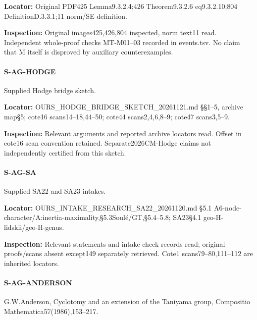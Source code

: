\documentclass[11pt,a4paper]{article}
\begin{document}
\textbf{Locator:} Original PDF425 Lemma9.\allowbreak{}3.\allowbreak{}2.\allowbreak{}4;426 Theorem9.\allowbreak{}3.\allowbreak{}2.\allowbreak{}6 eq9.\allowbreak{}3.\allowbreak{}2.\allowbreak{}10;804 DefinitionD.\allowbreak{}3.\allowbreak{}3.\allowbreak{}1;11 norm/\allowbreak{}SE definition.

\textbf{Inspection:} Original images425,426,804 inspected, norm text11 read.\allowbreak{} Independent whole-proof checks MT-M01–\allowbreak{}03 recorded in events.\allowbreak{}tsv.\allowbreak{} No claim that M itself is disproved by auxiliary counterexamples.\allowbreak{}


\paragraph{S-AG-HODGE} Supplied Hodge bridge sketch.

\textbf{Locator:} OURS\_\allowbreak{}HODGE\_\allowbreak{}BRIDGE\_\allowbreak{}SKETCH\_\allowbreak{}20261121.\allowbreak{}md §§1–\allowbreak{}5, archive map§5; cote16 scans14–\allowbreak{}18,44–\allowbreak{}50; cote44 scans2,4,6,8–\allowbreak{}9; cote47 scans3,5–\allowbreak{}9.

\textbf{Inspection:} Relevant arguments and reported archive locators read.\allowbreak{} Offset in cote16 scan convention retained.\allowbreak{} Separate2026CM-Hodge claims not independently certified from this sketch.\allowbreak{}


\paragraph{S-AG-SA} Supplied SA22 and SA23 intakes.

\textbf{Locator:} OURS\_\allowbreak{}INTAKE\_\allowbreak{}RESEARCH\_\allowbreak{}SA22\_\allowbreak{}20261120.\allowbreak{}md §5.\allowbreak{}1 A6-node-character/\allowbreak{}A:\allowbreak{}inertia-maximality,§5.\allowbreak{}3Soulé/\allowbreak{}GT,§5.\allowbreak{}4–\allowbreak{}5.\allowbreak{}8; SA23§4.\allowbreak{}1 geo-H-lidskii/\allowbreak{}geo-H-genus.

\textbf{Inspection:} Relevant statements and intake check records read; original proofs/\allowbreak{}scans absent except149 separately retrieved.\allowbreak{} Cote1 scans79–\allowbreak{}80,111–\allowbreak{}112 are inherited locators.\allowbreak{}


\paragraph{S-AG-ANDERSON} G.\allowbreak{}W.\allowbreak{}Anderson, Cyclotomy and an extension of the Taniyama group, Compositio Mathematica57(1986),153–\allowbreak{}217.
\end{document}
